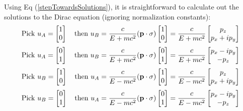Using Eq (\ref{stepTowardsSolutions}), it is straightforward to calculate out
the solutions to the Dirac equation (ignoring normalization constants):
\begin{equation*}
\mbox{Pick } u_A = \begin{bmatrix} 1\\0\end{bmatrix}\quad\mbox{then } 
u_B = \frac{c}{E + mc^2}(\bold{p}\cdot\sigma)\begin{bmatrix}1\\0\end{bmatrix} 
= \frac{c}{E + mc^2}\begin{bmatrix} p_{z}\\ p_{x}+ip_{y}\end{bmatrix}
\end{equation*}
\begin{equation*}
\mbox{Pick } u_A = \begin{bmatrix} 0\\1\end{bmatrix}\quad\mbox{then } 
u_B = \frac{c}{E + mc^2}(\bold{p}\cdot\sigma)\begin{bmatrix}0\\1\end{bmatrix} 
= \frac{c}{E + mc^2}\begin{bmatrix} p_{x}-ip_{y}\\ -p_{z}\end{bmatrix}
\end{equation*}
\begin{equation*}
\mbox{Pick } u_B = \begin{bmatrix} 1\\0\end{bmatrix}\quad\mbox{then } 
u_A = \frac{c}{E - mc^2}(\bold{p}\cdot\sigma)\begin{bmatrix}1\\0\end{bmatrix} 
= \frac{c}{E - mc^2}\begin{bmatrix} p_{z}\\ p_{x}+ip_{y}\end{bmatrix}
\end{equation*}
\begin{equation*}
\mbox{Pick } u_B = \begin{bmatrix} 0\\1\end{bmatrix}\quad\mbox{then } 
u_A = \frac{c}{E - mc^2}(\bold{p}\cdot\sigma)\begin{bmatrix}0\\1\end{bmatrix} 
= \frac{c}{E - mc^2}\begin{bmatrix} p_{x}-ip_{y}\\-p_{z}\end{bmatrix}
\end{equation*}

